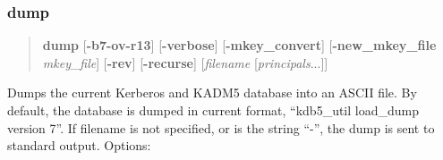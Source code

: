 \documentclass[letterpaper,10pt,english]{sphinxmanual}
\begin{document}
\subsubsection{dump}
\label{admin/admin_commands/kdb5_util:kdb5-util-stash-end}\label{admin/admin_commands/kdb5_util:dump}\label{admin/admin_commands/kdb5_util:kdb5-util-dump}\begin{quote}

\textbf{dump} {[}\textbf{-b7}\textbar{}\textbf{-ov}\textbar{}\textbf{-r13}{]} {[}\textbf{-verbose}{]}
{[}\textbf{-mkey\_convert}{]} {[}\textbf{-new\_mkey\_file} \emph{mkey\_file}{]} {[}\textbf{-rev}{]}
{[}\textbf{-recurse}{]} {[}\emph{filename} {[}\emph{principals}...{]}{]}
\end{quote}

Dumps the current Kerberos and KADM5 database into an ASCII file.  By
default, the database is dumped in current format, ``kdb5\_util
load\_dump version 7''.  If filename is not specified, or is the string
``-'', the dump is sent to standard output.  Options:
\end{document}
